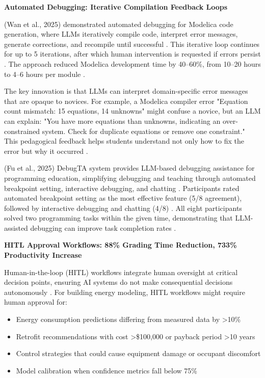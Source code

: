 \documentclass[12pt,a4paper]{article}
\begin{document}
\textbf{Automated Debugging: Iterative Compilation Feedback Loops}

(Wan et al., 2025) demonstrated automated debugging for Modelica code generation, where LLMs iteratively compile code, interpret error messages, generate corrections, and recompile until successful \cite{ref301}. This iterative loop continues for up to 5 iterations, after which human intervention is requested if errors persist \cite{ref302}. The approach reduced Modelica development time by 40--60\%, from 10--20 hours to 4--6 hours per module \cite{ref303}.

The key innovation is that LLMs can interpret domain-specific error messages that are opaque to novices. For example, a Modelica compiler error "Equation count mismatch: 15 equations, 14 unknowns" might confuse a novice, but an LLM can explain: "You have more equations than unknowns, indicating an over-constrained system. Check for duplicate equations or remove one constraint." \cite{ref304} This pedagogical feedback helps students understand not only how to fix the error but why it occurred \cite{ref305}.

(Fu et al., 2025) DebugTA system provides LLM-based debugging assistance for programming education, simplifying debugging and teaching through automated breakpoint setting, interactive debugging, and chatting \cite{ref306}. Participants rated automated breakpoint setting as the most effective feature (5/8 agreement), followed by interactive debugging and chatting (4/8) \cite{ref307}. All eight participants solved two programming tasks within the given time, demonstrating that LLM-assisted debugging can improve task completion rates \cite{ref308}.

\textbf{HITL Approval Workflows: 88\% Grading Time Reduction, 733\% Productivity Increase}

Human-in-the-loop (HITL) workflows integrate human oversight at critical decision points, ensuring AI systems do not make consequential decisions autonomously \cite{ref309}. For building energy modeling, HITL workflows might require human approval for:
\begin{itemize}
  \item Energy consumption predictions differing from measured data by >10\% \cite{ref310}
  \item Retrofit recommendations with cost >\$100,000 or payback period >10 years \cite{ref311}
  \item Control strategies that could cause equipment damage or occupant discomfort \cite{ref312}
  \item Model calibration when confidence metrics fall below 75\% \cite{ref313}
\end{itemize}
\end{document}
